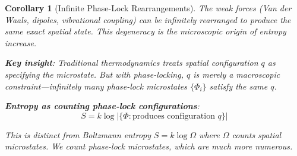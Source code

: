 \documentclass[12pt,a4paper]{article}
\newtheorem{corollary}[theorem]{Corollary}
\theoremstyle{remark}
\begin{document}
\begin{corollary}[Infinite Phase-Lock Rearrangements]
\label{cor:infinite_rearrangements}
The weak forces (Van der Waals, dipoles, vibrational coupling) can be infinitely rearranged to produce the same exact spatial state. This degeneracy is the microscopic origin of entropy increase.

\textbf{Key insight}: Traditional thermodynamics treats spatial configuration $q$ as specifying the microstate. But with phase-locking, $q$ is merely a macroscopic constraint—infinitely many phase-lock microstates $\{\Phi_i\}$ satisfy the same $q$.

\textbf{Entropy as counting phase-lock configurations}:
\begin{equation}
S = k \log |\{\Phi : \text{produces configuration } q\}|
\end{equation}

This is distinct from Boltzmann entropy $S = k \log \Omega$ where $\Omega$ counts spatial microstates. We count phase-lock microstates, which are much more numerous.
\end{corollary}
\end{document}
